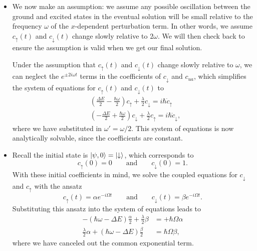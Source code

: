 \documentclass[11pt, a4paper]{article}
\newcommand{\eqtext}[1]{\qquad \text{#1} \qquad}
\newcommand{\p}{\psi}  %
\newcommand{\ua}{\uparrow}  %
\newcommand{\da}{\downarrow}  %
\begin{document}
\begin{itemize}
	\item We now make an assumption: we assume any possible oscillation between the ground and excited states in the eventual solution will be small relative to the frequency $ \omega $ of the $ x $-dependent perturbation term. In other words, we assume $ c_{\ua}(t) $ and $ c_{\da}(t) $ change slowly relative to $ 2\omega $. We will then check back to ensure the assumption is valid when we get our final solution. 
	
	Under the assumption that $ c_{\ua}(t) $ and $ c_{\da}(t) $ change slowly relative to $ \omega $, we can neglect the $ e^{\pm 2i\omega t} $ terms in the coefficients of $ c_{\da} $ and $ c_{ua} $, which simplifies the system of equations for $ c_{\ua}(t) $ and $ c_{\da}(t) $ to
	\begin{align*}
		&\left(\frac{\Delta E}{2} - \frac{\hbar \omega}{2} \right) c_{\ua} + \frac{\lambda}{2}c_{\da} = i\hbar \dot{c}_{\ua}\\
		&\left(-\frac{\Delta E}{2} + \frac{\hbar \omega}{2} \right) c_{\da} + \frac{\lambda}{2}c_{\ua} = i\hbar \dot{c}_{\da},
	\end{align*}
	where we have substituted in $ \omega' = \omega/2 $. This system of equations is now analytically solvable, since the coefficients are constant. 
	
	\item Recall the initial state is $ \ket{\p, 0} = \ket{\da} $, which corresponds to
	\begin{equation*}
		c_{\ua}(0) = 0 \eqtext{and} c_{\da}(0) = 1.
	\end{equation*}
	With these initial coefficients in mind, we solve the coupled equations for $ c_{\da} $ and $ c_{\ua} $ with the ansatz
	\begin{equation*}
		c_{\ua}(t) = \alpha e^{-i\Omega t} \eqtext{and} c_{\da}(t) = \beta e^{-i\Omega t}.
	\end{equation*}
	Substituting this ansatz into the system of equations leads to
	\begin{align*}
        -(\hbar \omega - \Delta E)\frac{\alpha}{2} + \frac{\lambda}{2}\beta &= +\hbar \Omega \alpha\\
         \frac{\lambda}{2} \alpha + (\hbar \omega - \Delta E)\frac{\beta}{2} &= \hbar \Omega \beta,
	\end{align*}
	where we have canceled out the common exponential term.
	

\end{itemize}
\end{document}
